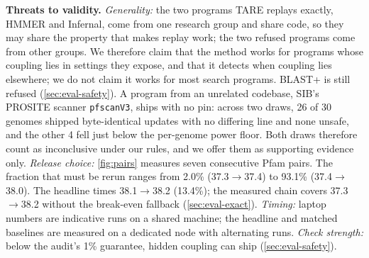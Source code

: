 \documentclass[letterpaper,twocolumn,10pt]{article}
\theoremstyle{definition}
\newcommand{\sys}{TARE\xspace}
\newcommand{\sys}{PARE\xspace}
\begin{document}
\textbf{Threats to validity.}
 \textit{Generality:} the two programs \sys replays exactly, HMMER and Infernal, come from one
research group and share code, so they may share the property that makes replay work; the two refused programs come from
other groups. We therefore claim that the method works for programs whose coupling lies in settings they expose, and that
it detects when coupling lies elsewhere; we do not claim it works for most search programs. BLAST+ is still refused (\cref{sec:eval-safety}). A program from an unrelated codebase, SIB's PROSITE scanner
\texttt{pfscanV3}, ships with no pin: across two draws, 26 of 30 genomes shipped byte\nobreakdash-identical updates with no
differing line and none unsafe, and the other 4 fell just below the per\nobreakdash-genome power floor. Both draws therefore count
as inconclusive under our rules, and we offer them as supporting evidence only.
\textit{Release choice:} \cref{fig:pairs} measures seven consecutive Pfam pairs. The fraction that must be rerun ranges from 2.0\% (37.3$\rightarrow$37.4) to 93.1\% (37.4$\rightarrow$38.0). The headline times 38.1$\rightarrow$38.2 (13.4\%); the measured chain covers 37.3$\rightarrow$38.2 without the break\nobreakdash-even fallback (\cref{sec:eval-exact}). \textit{Timing:} laptop numbers are indicative runs on a shared machine; the headline and matched baselines are measured on a dedicated
node with alternating runs. \textit{Check strength:} below the audit's 1\% guarantee, hidden coupling can ship (\cref{sec:eval-safety}).
\end{document}
